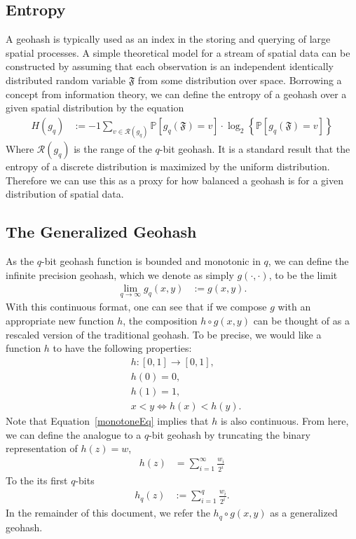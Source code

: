 \documentclass[nips13submit_09,times,art10]{article} %
\begin{document}
\subsection{Entropy}

A geohash is typically used as an index in the storing and querying of large
spatial processes. A simple theoretical model for a stream of spatial data can
be constructed by assuming that each observation is an independent identically
distributed random variable $\mathfrak{F}$ from some distribution over space.
Borrowing a concept from information theory, we can define the entropy of a geohash
over a given spatial distribution by the equation
\begin{align}
H(g_q) &:= -1 \sum_{v \in \mathcal{R}(g_q)} \mathbb{P} \left[ g_q(\mathfrak{F}) = v\right] \cdot
            \log_2 \left\{ \mathbb{P} \left[ g_q(\mathfrak{F}) = v\right] \right\} \label{entropyDef}
\end{align}
Where $\mathcal{R}(g_q)$ is the range of the $q$-bit geohash. It is a standard result
that the entropy of a discrete distribution is maximized by the uniform distribution.
Therefore we can use this as a proxy for how balanced a geohash is for a given distribution
of spatial data.

\subsection{The Generalized Geohash}

As the $q$-bit geohash function is bounded and monotonic in $q$, we can define the infinite
precision geohash, which we denote as simply $g(\cdot, \cdot)$, to be the limit
\begin{align}
\lim_{q \rightarrow \infty} g_q(x,y) &:= g(x,y).
\end{align}
With this continuous format, one can see that if we compose $g$ with an appropriate new function
$h$, the composition $h \circ g(x,y)$ can be thought of as a rescaled version of the
traditional geohash. To be precise, we would like a function $h$ to have the following properties:
\begin{align}
&h: [0,1] \rightarrow [0,1], \label{hDef} \\
&h(0) = 0, \\
&h(1) = 1, \\
&x < y \iff h(x) < h(y). \label{monotoneEq}
\end{align}
Note that Equation~\ref{monotoneEq} implies that $h$ is also continuous. From here, we can define
the analogue to a $q$-bit geohash by truncating the binary representation of $h(z) = w$,
\begin{align}
h(z) &= \sum_{i=1}^{\infty} \frac{w_i}{2^i}
\end{align}
To the its first $q$-bits
\begin{align}
h_q(z) &:= \sum_{i=1}^{q} \frac{w_i}{2^i}.
\end{align}
In the remainder of this document, we refer the $h_q \circ g(x,y)$ as a generalized geohash.
\end{document}
